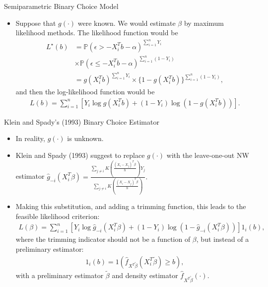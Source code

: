 \documentclass[xcolor=svgnames,dvipdfmx,cjk]{beamer}
\theoremstyle{example}
\def\P{\mathbb{P}}
\begin{document}
  
\begin{frame}{Semiparametric Binary Choice Model}
\begin{itemize}
  \item Suppose that $g(\cdot)$ were known. 
        We would estimate $\beta$ by maximum likelihood methods.
        The likelihood function would be 
        \begin{align*}
          L^{\star}(b) &= \P(\epsilon > -X_i^Tb - \alpha)^{\sum_{i=1}^n Y_i}\\
                       &\times 
                        \P(\epsilon \leq -X_i^Tb  -\alpha)^{\sum_{i=1}^n (1-Y_i)} \\
                       &= g(X_i^Tb)^{\sum_{i=1}^n Y_i} \times \{1-g(X_i^Tb)\}^{\sum_{i=1}^n (1-Y_i)},
        \end{align*}
        and then the log-likelihood function would be
        \begin{align*}
          L(b) = \sum_{i=1}^{n}[Y_i \log g(X_i^Tb) + (1 - Y_i) \log (1 - g(X_i^Tb))].
        \end{align*}
\end{itemize}
\end{frame}  
 
\begin{frame}{Klein and Spady's (1993) Binary Choice Estimator}
 \begin{itemize}
  \item In reality, $g(\cdot)$ is unknown.
  \item Klein and Spady (1993) suggest to replace $g(\cdot)$ with the leave-one-out NW estimator
        $\hat{g}_{-i}(X_i^T \beta) = \frac{\sum_{j \neq i} K \left( \frac{(X_i - X_j)^T \beta}{h}\right)Y_j}{\sum_{j \neq i} K \left( \frac{(X_i - X_j)^T \beta}{h}\right)}.$
  \item Making this substitution, and adding a trimming function, this leads to the feasible likelihood criterion:
        \begin{align*}
          L(\beta) = \sum_{i=1}^{n}[Y_i \log \hat{g}_{-i}(X_i^T \beta) + (1 - Y_i) \log (1 - \hat{g}_{-i}(X_i^T \beta))]1_{i}(b),
        \end{align*}
        where the trimming indicator should not be a function of $\beta$, but instead of a preliminary estimator:
        \begin{align*}
          1_i(b) = 1\left( \hat{f}_{X^T\tilde{\beta}}(X_i^T\tilde{\beta}) \geq b \right),
        \end{align*}
        with a preliminary estimator $\tilde{\beta}$ and density estimator $\hat{f}_{X^T\tilde{\beta}}(\cdot)$.
 \end{itemize} 
\end{frame}
\end{document}
